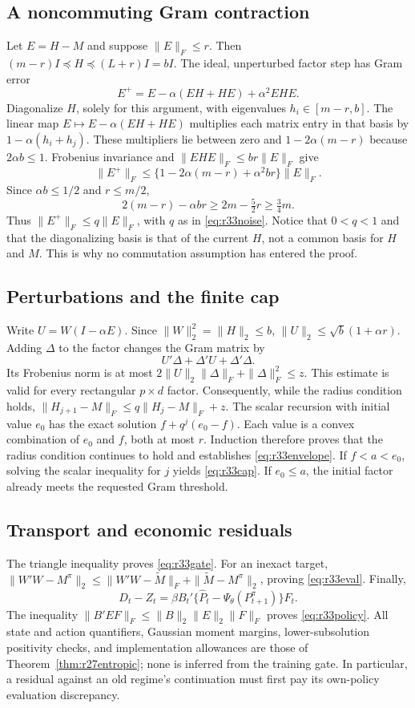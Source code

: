 \documentclass[ecta,nameyear,draft]{econsocart}
\theoremstyle{definition}
\theoremstyle{remark}
\begin{document}
\subsection{A noncommuting Gram contraction}
Let $E=H-M$ and suppose $\|E\|_F\leq r$. Then
$(m-r)I\preceq H\preceq(L+r)I=bI$. The ideal, unperturbed factor step has
Gram error
\begin{equation}\label{eq:r33gramidentity}
 E^+=E-\alpha(EH+HE)+\alpha^2EHE.
\end{equation}
Diagonalize $H$, solely for this argument, with eigenvalues
$h_i\in[m-r,b]$. The linear map
$E\mapsto E-\alpha(EH+HE)$ multiplies each matrix entry in that basis by
$1-\alpha(h_i+h_j)$. These multipliers lie between zero and
$1-2\alpha(m-r)$ because $2\alpha b\leq1$. Frobenius invariance and
$\|EHE\|_F\leq br\|E\|_F$ give
\[
 \|E^+\|_F\leq
 \{1-2\alpha(m-r)+\alpha^2br\}\|E\|_F.
\]
Since $\alpha b\leq1/2$ and $r\leq m/2$,
\[
 2(m-r)-\alpha br\geq2m-\tfrac52r\geq\tfrac34m.
\]
Thus $\|E^+\|_F\leq q\|E\|_F$, with $q$ as in
\eqref{eq:r33noise}. Notice that $0<q<1$ and that the diagonalizing basis
is that of the current $H$, not a common basis for $H$ and $M$. This is why
no commutation assumption has entered the proof.

\subsection{Perturbations and the finite cap}
Write $U=W(I-\alpha E)$. Since $\|W\|_2^2=\|H\|_2\leq b$,
$\|U\|_2\leq\sqrt b(1+\alpha r)$. Adding $\Delta$ to the factor changes
the Gram matrix by
\[
 U'\Delta+\Delta'U+\Delta'\Delta.
\]
Its Frobenius norm is at most
$2\|U\|_2\|\Delta\|_F+\|\Delta\|_F^2\leq z$.
This estimate is valid for every rectangular $p\times d$ factor.
Consequently, while the radius condition holds,
$\|H_{j+1}-M\|_F\leq q\|H_j-M\|_F+z$.
The scalar recursion with initial value $e_0$ has the exact solution
$f+q^j(e_0-f)$. Each value is a convex combination of $e_0$ and $f$, both
at most $r$. Induction therefore proves that the radius condition continues
to hold and establishes \eqref{eq:r33envelope}. If $f<a<e_0$, solving the
scalar inequality for $j$ yields \eqref{eq:r33cap}. If $e_0\leq a$, the
initial factor already meets the requested Gram threshold.

\subsection{Transport and economic residuals}
The triangle inequality proves \eqref{eq:r33gate}. For an inexact target,
$\|W'W-M^\pi\|_2\leq\|W'W-\widetilde M\|_F+
\|\widetilde M-M^\pi\|_2$, proving \eqref{eq:r33eval}.
Finally,
\[
 D_t-Z_t=\beta B_t'\{\widehat P_t-\Psi_\theta(P_{t+1}^\pi)\}F_t.
\]
The inequality $\|B'EF\|_F\leq\|B\|_2\|E\|_2\|F\|_F$ proves
\eqref{eq:r33policy}. All state and action quantifiers, Gaussian moment
margins, lower-subsolution positivity checks, and implementation allowances
are those of Theorem~\ref{thm:r27entropic}; none is inferred from the
training gate. In particular, a residual against an old regime's continuation
must first pay its own-policy evaluation discrepancy.
\end{document}
